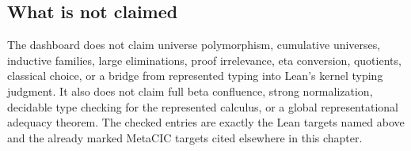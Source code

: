 \subsection*{What is not claimed}
\label{subsec:metacic-mechanization-not-claimed}

The dashboard does not claim universe polymorphism, cumulative universes,
inductive families, large eliminations, proof irrelevance, eta conversion,
quotients, classical choice, or a bridge from represented typing into Lean's
kernel typing judgment. It also does not claim full beta confluence, strong
normalization, decidable type checking for the represented calculus, or a
global representational adequacy theorem. The checked entries are exactly
the Lean targets named above and the already marked MetaCIC targets cited
elsewhere in this chapter.
